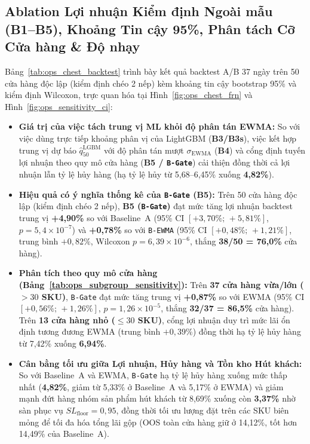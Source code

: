 \subsection*{Ablation Lợi nhuận Kiểm định Ngoài mẫu (B1--B5), Khoảng Tin cậy 95\%, Phân tách Cỡ Cửa hàng \& Độ nhạy}
Bảng~\ref{tab:ops_chest_backtest} trình bày kết quả backtest A/B 37 ngày trên 50 cửa hàng độc lập (kiểm định chéo 2 nếp) kèm khoảng tin cậy bootstrap 95\% và kiểm định Wilcoxon, trực quan hóa tại Hình~\ref{fig:ops_chest_frn} và Hình~\ref{fig:ops_sensitivity_ci}:
\begin{itemize}
    \item \textbf{Giá trị của việc tách trung vị ML khỏi độ phân tán EWMA:} So với việc dùng trực tiếp khoảng phân vị của LightGBM (\textbf{B3/B3s}), việc kết hợp trung vị dự báo $\hat{q}_{50}^{\text{LGBM}}$ với độ phân tán mượt $\sigma_{\text{EWMA}}$ (\textbf{B4}) và cổng định tuyến lợi nhuận theo quy mô cửa hàng (\textbf{B5 / \texttt{B-Gate}}) cải thiện đồng thời cả lợi nhuận lẫn tỷ lệ hủy hàng (hạ tỷ lệ hủy từ 5,68--6,45\% xuống \textbf{4,82\%}).
    \item \textbf{Hiệu quả có ý nghĩa thống kê của \texttt{B-Gate} (B5):} Trên 50 cửa hàng độc lập (kiểm định chéo 2 nếp), \textbf{B5 (\texttt{B-Gate})} đạt mức tăng lợi nhuận backtest trung vị \textbf{+4,90\%} so với Baseline~A (95\% CI $[+3{,}70\%;\,+5{,}81\%]$, $p = 5{,}4\times 10^{-7}$) và \textbf{+0,78\%} so với \texttt{B-EWMA} (95\% CI \textbf{$[+0{,}48\%;\,+1{,}21\%]$}, trung bình $+0{,}82\%$, Wilcoxon \textbf{$p = 6{,}39\times 10^{-6}$}, thắng \textbf{38/50 = 76,0\%} cửa hàng).
    \item \textbf{Phân tích theo quy mô cửa hàng (Bảng~\ref{tab:ops_subgroup_sensitivity}):} Trên \textbf{37 cửa hàng vừa/lớn ($>30$ SKU)}, \texttt{B-Gate} đạt mức tăng trung vị \textbf{+0,87\%} so với EWMA (95\% CI $[+0{,}56\%;\,+1{,}26\%]$, $p = 1{,}26\times 10^{-5}$, thắng \textbf{32/37 = 86,5\%} cửa hàng). Trên \textbf{13 cửa hàng nhỏ ($\le 30$ SKU)}, cổng lợi nhuận duy trì mức lãi ổn định tương đương EWMA (trung bình $+0{,}39\%$) đồng thời hạ tỷ lệ hủy hàng từ 7,42\% xuống \textbf{6,94\%}.
    \item \textbf{Cân bằng tối ưu giữa Lợi nhuận, Hủy hàng và Tồn kho Hút khách:} So với Baseline~A và EWMA, \texttt{B-Gate} hạ tỷ lệ hủy hàng xuống mức thấp nhất (\textbf{4,82\%}, giảm từ 5,33\% ở Baseline~A và 5,17\% ở EWMA) và giảm mạnh đứt hàng nhóm sản phẩm hút khách từ 8,69\% xuống còn \textbf{3,37\%} nhờ sàn phục vụ $SL_{\text{floor}} = 0{,}95$, đồng thời tối ưu lượng đặt trên các SKU biên mỏng để tối đa hóa tổng lãi gộp (OOS toàn cửa hàng giữ ở 14,12\%, tốt hơn 14,49\% của Baseline~A).

\end{itemize}
